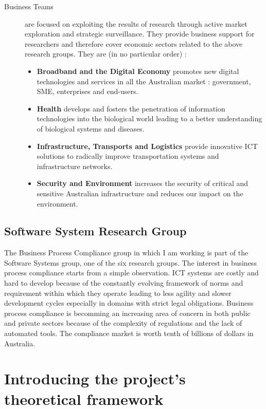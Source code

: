 \documentclass[10pt]{article}
\begin{document}
\begin{description}
\item[Business Teams] are focused on exploiting the results of research through active market exploration and strategic surveillance. They provide business support for researchers and therefore cover economic sectors related to the above research groups. They are (in no particular order) :
\begin{itemize}
\item \textbf{Broadband and the Digital Economy} promotes new digital technologies and services in all the Australian market : government, SME, enterprises and end-users.
\item \textbf{Health} develops and fosters the penetration of information technologies into the biological world leading to a better understanding of biological systems and diseases.
\item \textbf{Infrastructure, Transports and Logistics} provide innovative ICT solutions to radically improve transportation systems and infrastructure networks.
\item \textbf{Security and Environment} increases the security of critical and sensitive Australian infrastructure and reduces our impact on the environment.
\end{itemize}
\end{description}

\subsection{Software System Research Group}

The Business Process Compliance group in which I am working is part of the Software Systems group, one of the six research groups. The interest in business process compliance starts from a simple observation. ICT systems are costly and hard to develop because of the constantly evolving framework of norms and requirement within which they operate leading to less agility and slower development cycles especially in domains with strict legal obligations. Business process compliance is becomming an increasing area of concern in both public and private sectors because of the complexity of regulations and the lack of automated tools. The compliance market is worth tenth of billions of dollars in Australia.\autocite{BPCWebsite}








\newpage

\section{Introducing the project's theoretical framework}
\end{document}
